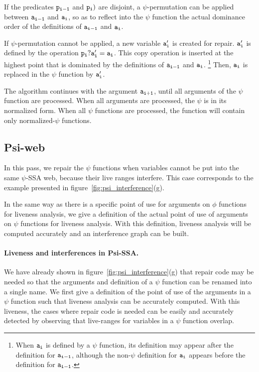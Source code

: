 If the predicates ${\tt p_{i-1}}$ and ${\tt p_i})$ are disjoint, a
$\psi$-permutation can be applied between ${\tt a_{i-1}}$ and ${\tt
  a_i}$, so as to reflect into the $\psi$ function the actual
dominance order of the definitions of ${\tt a_{i-1}}$ and ${\tt a_i}$.

If $\psi$-permutation cannot be applied, a new variable ${\tt a'_i}$
is created for repair. ${\tt a'_i}$ is defined by the operation ${\tt
  p_i? a'_i = a_i}$. This copy operation is inserted at the highest
point that is dominated by the definitions of ${\tt a_{i-1}}$ and
${\tt a_i}$.
\footnote{When ${\tt a_i}$ is defined by a $\psi$ function, its
  definition may appear after the definition for ${\tt a_{i-1}}$,
  although the non-$\psi$ definition for ${\tt a_i}$ appears before
  the definition for ${\tt a_{i-1}}$.}
Then, ${\tt a_i}$ is replaced in the $\psi$ function by ${\tt a'_i}$.

The algorithm continues with the argument ${\tt a_{i+1}}$, until all
arguments of the $\psi$ function are processed. When all arguments
are processed, the $\psi$ is in its normalized form. When all $\psi$
functions are processed, the function will contain only
normalized-$\psi$ functions.


\subsection{Psi-web}

In this pass, we repair the $\psi$ functions when variables cannot be
put into the same $\psi$-SSA web, because their live ranges
interfere. This case corresponds to the example presented in
figure~\ref{fig:psi_interference}(g).

In the same way as there is a specific point of use for arguments on
$\phi$ functions for liveness analysis, we give a definition of the
actual point of use of arguments on $\psi$ functions for liveness
analysis. With this definition, liveness analysis will be computed
accurately and an interference graph can be built.

\paragraph{Liveness and interferences in Psi-SSA.}
We have already shown in figure~\ref{fig:psi_interference}(g) that
repair code may be needed so that the arguments and definition of a
$\psi$ function can be renamed into a single name. We first give a
definition of the point of use of the arguments in a $\psi$ function
such that liveness analysis can be accurately computed. With this
liveness, the cases where repair code is needed can be easily and
accurately detected by observing that live-ranges for variables in a
$\psi$ function overlap.

